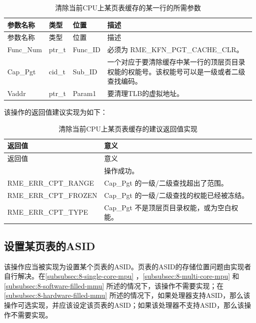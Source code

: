 \begin{xltabular}{\textwidth}{@{}>{\hsize\raggedright\arraybackslash}X>{\hsize\raggedright\arraybackslash}X>{\hsize\raggedright\arraybackslash}X>{\hsize\raggedright\arraybackslash}X@{}}
\caption{清除当前CPU上某页表缓存的某一行的所需参数}\label{tab:8-7-clear-page-table-cache-line-parameters}\\
\toprule
参数名称 & 类型 & 位置 & 描述\tabularnewline
\endfirsthead
\toprule
参数名称 & 类型 & 位置 & 描述\tabularnewline
\midrule
\endhead
\bottomrule
\endlastfoot
Func\_Num & ptr\_t & Func\_ID & 必须为 RME\_KFN\_PGT\_CACHE\_CLR。\tabularnewline
Cap\_Pgt & cid\_t & Sub\_ID &
一个对应于要清除缓存中某一行的顶层页目录权能的权能号。该权能号可以是一级或者二级查找编码。\tabularnewline
Vaddr & ptr\_t & Param1 & 要清理TLB的虚拟地址。\tabularnewline
\end{xltabular}

该操作的返回值建议实现为如下：

\begin{xltabular}{\textwidth}{@{}>{\hsize\raggedright\arraybackslash}X>{\hsize\raggedright\arraybackslash}X@{}}
\caption{清除当前CPU上某页表缓存的建议返回值实现}\label{tab:8-8-clear-page-table-cache-line-suggested-return-values}\\
\toprule
返回值 & 意义\tabularnewline
\endfirsthead
\toprule
返回值 & 意义\tabularnewline
\midrule
\endhead
\bottomrule
{} & 操作成功。\tabularnewline
    RME\_ERR\_CPT\_RANGE & Cap\_Pgt 的一级/二级查找超出了范围。\tabularnewline
    RME\_ERR\_CPT\_FROZEN & Cap\_Pgt 的一级/二级查找的权能已经被冻结。\tabularnewline
    RME\_ERR\_CPT\_TYPE & Cap\_Pgt 不是顶层页目录权能，或为空白权能。\tabularnewline
\end{xltabular}

\subsection{设置某页表的ASID}\label{subsec:8-set-page-table-asid}

该操作应当被实现为设置某个页表的ASID。页表的ASID的存储位置问题由实现者自行解决。在\ref{subsubsec:8-single-core-mpu}
，\ref{subsubsec:8-multi-core-mpu}
和\ref{subsubsec:8-software-filled-mmu}
所述的情况下，该操作不需要实现；在\ref{subsubsec:8-hardware-filled-mmu}
所述的情况下，如果处理器支持ASID，那么该操作可选实现，并应该设定该页表的ASID；如果该处理器不支持ASID，那么该操作不需要实现。

